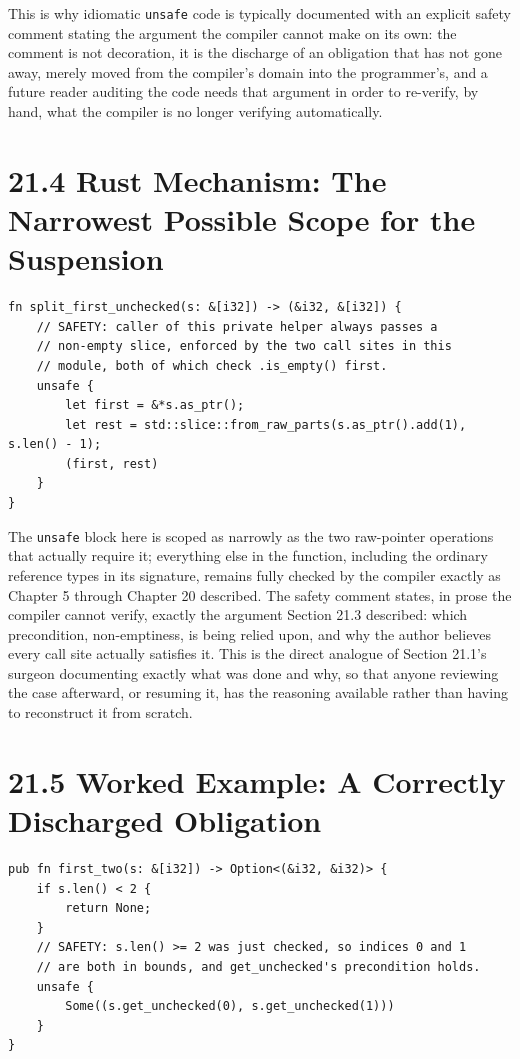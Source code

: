 \documentclass[11pt]{book}
\begin{document}
This is why idiomatic \texttt{unsafe} code is typically documented with an explicit safety comment stating the argument the compiler cannot make on its own: the comment is not decoration, it is the discharge of an obligation that has not gone away, merely moved from the compiler's domain into the programmer's, and a future reader auditing the code needs that argument in order to re-verify, by hand, what the compiler is no longer verifying automatically.

\section*{21.4 Rust Mechanism: The Narrowest Possible Scope for the Suspension}

\begin{lstlisting}
fn split_first_unchecked(s: &[i32]) -> (&i32, &[i32]) {
    // SAFETY: caller of this private helper always passes a
    // non-empty slice, enforced by the two call sites in this
    // module, both of which check .is_empty() first.
    unsafe {
        let first = &*s.as_ptr();
        let rest = std::slice::from_raw_parts(s.as_ptr().add(1), s.len() - 1);
        (first, rest)
    }
}
\end{lstlisting}

The \texttt{unsafe} block here is scoped as narrowly as the two raw-pointer operations that actually require it; everything else in the function, including the ordinary reference types in its signature, remains fully checked by the compiler exactly as Chapter 5 through Chapter 20 described. The safety comment states, in prose the compiler cannot verify, exactly the argument Section 21.3 described: which precondition, non-emptiness, is being relied upon, and why the author believes every call site actually satisfies it. This is the direct analogue of Section 21.1's surgeon documenting exactly what was done and why, so that anyone reviewing the case afterward, or resuming it, has the reasoning available rather than having to reconstruct it from scratch.

\section*{21.5 Worked Example: A Correctly Discharged Obligation}

\begin{lstlisting}
pub fn first_two(s: &[i32]) -> Option<(&i32, &i32)> {
    if s.len() < 2 {
        return None;
    }
    // SAFETY: s.len() >= 2 was just checked, so indices 0 and 1
    // are both in bounds, and get_unchecked's precondition holds.
    unsafe {
        Some((s.get_unchecked(0), s.get_unchecked(1)))
    }
}
\end{lstlisting}
\end{document}
